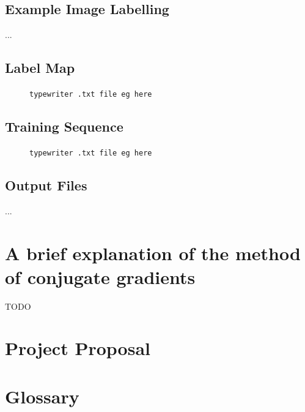 \documentclass[12pt,twoside,notitlepage]{report}
\begin{document}
    \section{Example Image Labelling}
        ...
    
    \section{Label Map}
        \begin{figure}[H]
            \begin{framed}
                {\tt typewriter .txt file eg here }
            \end{framed}
        \end{figure}

    \section{Training Sequence}
        \begin{figure}[H]
            \begin{framed}
                {\tt typewriter .txt file eg here }
            \end{framed}
        \end{figure}

    \section{Output Files}
        ...










\cleardoublepage
\chapter{A brief explanation of the method of conjugate gradients}
    TODO












\cleardoublepage
\chapter{Project Proposal}













\cleardoublepage
\chapter{Glossary}
\glsaddall
\printglossaries
\end{document}

